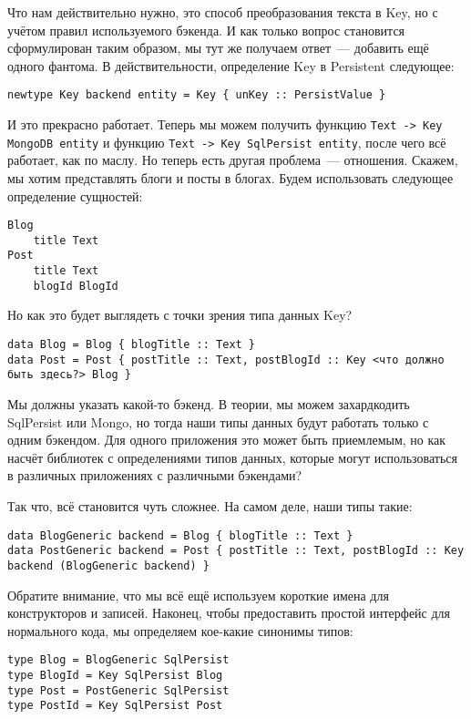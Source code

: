 Что нам действительно нужно, это способ преобразования текста в Key, но с учётом правил используемого бэкенда. И как только вопрос становится сформулирован таким образом, мы тут же получаем ответ~--- добавить ещё одного фантома. В действительности, определение Key в Persistent следующее:

\begin{lstlisting}
newtype Key backend entity = Key { unKey :: PersistValue }
\end{lstlisting}

И это прекрасно работает. Теперь мы можем получить функцию \lstinline'Text -> Key MongoDB entity' и функцию \lstinline'Text -> Key SqlPersist entity', после чего всё работает, как по маслу. Но теперь есть другая проблема~--- отношения. Скажем, мы хотим представлять блоги и посты в блогах. Будем использовать следующее определение сущностей:

\begin{lstlisting}
Blog
    title Text
Post
    title Text
    blogId BlogId
\end{lstlisting}

Но как это будет выглядеть с точки зрения типа данных Key?

\begin{lstlisting}
data Blog = Blog { blogTitle :: Text }
data Post = Post { postTitle :: Text, postBlogId :: Key <что должно быть здесь?> Blog }
\end{lstlisting}

Мы должны указать какой-то бэкенд. В теории, мы можем захардкодить SqlPersist или Mongo, но тогда наши типы данных будут работать только с одним бэкендом. Для одного приложения это может быть приемлемым, но как насчёт библиотек с определениями типов данных, которые могут использоваться в различных приложениях с различными бэкендами?

Так что, всё становится чуть сложнее. На самом деле, наши типы такие:

\begin{lstlisting}
data BlogGeneric backend = Blog { blogTitle :: Text }
data PostGeneric backend = Post { postTitle :: Text, postBlogId :: Key backend (BlogGeneric backend) }
\end{lstlisting}

Обратите внимание, что мы всё ещё используем короткие имена для конструкторов и записей. Наконец, чтобы предоставить простой интерфейс для нормального кода, мы определяем кое-какие синонимы типов:

\begin{lstlisting}
type Blog = BlogGeneric SqlPersist
type BlogId = Key SqlPersist Blog
type Post = PostGeneric SqlPersist
type PostId = Key SqlPersist Post
\end{lstlisting}


